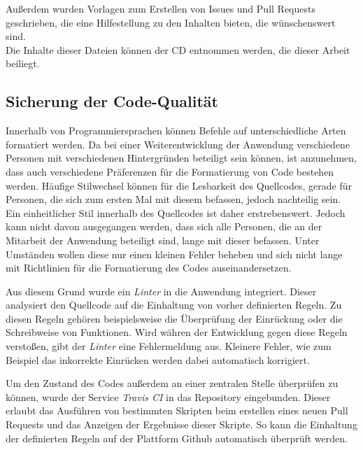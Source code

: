 Außerdem wurden Vorlagen zum Erstellen von Issues\footnotemark{} und Pull Requests geschrieben, die eine Hilfestellung zu den Inhalten bieten, die wünschenswert sind.\\
Die Inhalte dieser Dateien können der CD entnommen werden, die dieser Arbeit beiliegt.


\subsection{Sicherung der Code-Qualität}
Innerhalb von Programmiersprachen können Befehle auf unterschiedliche Arten formatiert werden. Da bei einer Weiterentwicklung der Anwendung verschiedene Personen mit verschiedenen Hintergründen beteiligt sein können, ist anzunehmen, dass auch verschiedene Präferenzen für die Formatierung von Code bestehen werden.
Häufige Stilwechsel können für die Lesbarkeit des Quellcodes, gerade für Personen, die sich zum ersten Mal mit diesem befassen, jedoch nachteilig sein. Ein einheitlicher Stil innerhalb des Quellcodes ist daher erstrebenswert. Jedoch kann nicht davon ausgegangen werden, dass sich alle Personen, die an der Mitarbeit der Anwendung beteiligt sind, lange mit dieser befassen. Unter Umständen wollen diese nur einen kleinen Fehler beheben und sich nicht lange mit Richtlinien für die Formatierung des Codes auseinandersetzen.

Aus diesem Grund wurde ein \textit{Linter} in die Anwendung integriert. Dieser analysiert den Quellcode auf die Einhaltung von vorher definierten Regeln. Zu diesen Regeln gehören beispielsweise die Überprüfung der Einrückung oder die Schreibweise von Funktionen.
Wird währen der Entwicklung gegen diese Regeln verstoßen, gibt der \textit{Linter} eine Fehlermeldung aus. Kleinere Fehler, wie zum Beispiel das inkorrekte Einrücken werden dabei automatisch korrigiert.

Um den Zustand des Codes außerdem an einer zentralen Stelle überprüfen zu können, wurde der Service \textit{Travis CI}\footnotemark{} in das Repository eingebunden. Dieser erlaubt das Ausführen von bestimmten Skripten beim erstellen eines neuen Pull Requests und das Anzeigen der Ergebnisse dieser Skripte. So kann die Einhaltung der definierten Regeln auf der Plattform Github automatisch überprüft werden.


